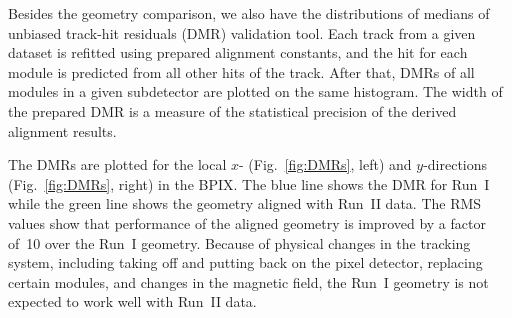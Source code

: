 Besides the geometry comparison, we also have the distributions of medians of unbiased track-hit residuals (DMR) validation tool. Each track from a given dataset is refitted using prepared alignment constants, and the hit for each module is predicted from all other hits of the track. After that, DMRs of all modules in a given subdetector are plotted on the same histogram. The width of the prepared DMR is a measure of the statistical precision of the derived alignment results. 


The DMRs are plotted for the local $x$- (Fig.~\ref{fig:DMRs}, left) and $y$-directions (Fig.~\ref{fig:DMRs}, right) in the BPIX. The blue line shows the DMR for Run~I while the green line shows the geometry aligned with Run~II data. The RMS values show that performance of the aligned geometry is improved by a factor of~10 over the Run~I geometry. Because of physical changes in the tracking system, including taking off and putting back on the pixel detector, replacing certain modules, and changes in the magnetic field, the Run~I geometry is not expected to work well with Run~II data.  

